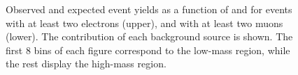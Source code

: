 \begin{figure}[h]
\noindent
{}
\caption{Observed and expected event yields as a function of \mmin and
  \mtmin for events with
at least two electrons (upper), and with at least two muons (lower). The contribution of each
background source is shown. The first 8 bins of each figure correspond to the low-mass region,
while the rest display the high-mass region. \willem}
\label{fig:allSRplotMuon}
\end{figure}

\clearpage
